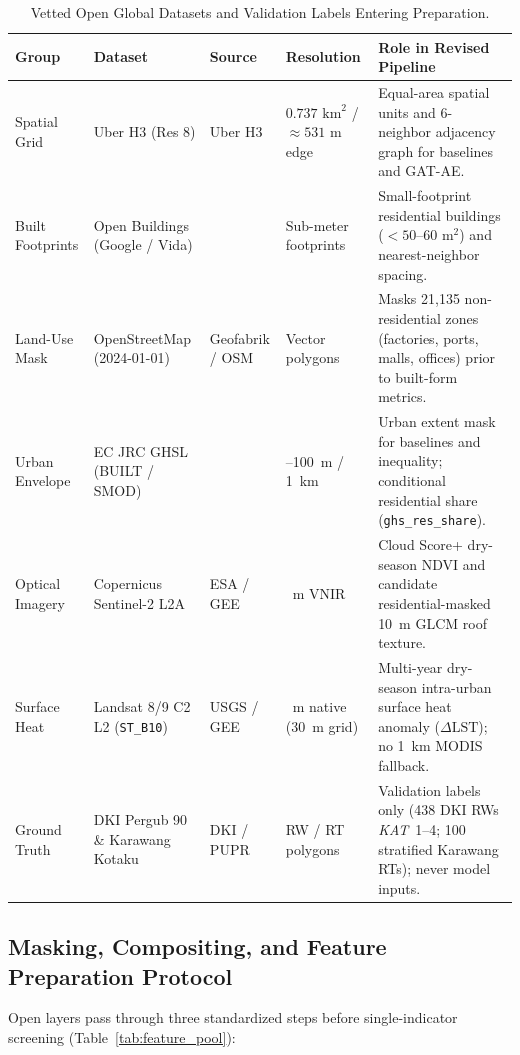 \begin{table}[htbp]
\centering
\caption{Vetted Open Global Datasets and Validation Labels Entering Preparation.}
\label{tab:dataset_inventory}
\footnotesize
\begin{tabularx}{\textwidth}{@{}>{\raggedright\arraybackslash}p{2.2cm}>{\raggedright\arraybackslash}p{3.0cm}>{\raggedright\arraybackslash}p{2.3cm}>{\raggedright\arraybackslash}p{2.0cm}>{\raggedright\arraybackslash}X@{}}
\toprule
\textbf{Group} & \textbf{Dataset} & \textbf{Source} & \textbf{Resolution} & \textbf{Role in Revised Pipeline} \\
\midrule
Spatial Grid & Uber H3 (Res 8) & Uber H3 & $0.737\text{ km}^2$ / $\approx 531\text{ m}$ edge & Equal-area spatial units and 6-neighbor adjacency graph for baselines and GAT-AE. \\
Built Footprints & Open Buildings (Google / Vida) & \citet{Sirko2021} & Sub-meter footprints & Small-footprint residential buildings ($<50$--$60\text{ m}^2$) and nearest-neighbor spacing. \\
Land-Use Mask & OpenStreetMap (2024-01-01) & Geofabrik / OSM & Vector polygons & Masks 21,135 non-residential zones (factories, ports, malls, offices) prior to built-form metrics. \\
Urban Envelope & EC JRC GHSL (BUILT / SMOD) & \citet{Pesaresi2024} & 10--100~m / 1~km & Urban extent mask for baselines and inequality; conditional residential share (\texttt{ghs\_res\_share}). \\
Optical Imagery & Copernicus Sentinel-2 L2A & ESA / GEE & 10~m VNIR & Cloud Score+ dry-season NDVI and candidate residential-masked 10~m GLCM roof texture. \\
Surface Heat & Landsat 8/9 C2 L2 (\texttt{ST\_B10}) & USGS / GEE & 100~m native (30~m grid) & Multi-year dry-season intra-urban surface heat anomaly ($\Delta\text{LST}$); no 1~km MODIS fallback. \\
Ground Truth & DKI Pergub 90 \& Karawang Kotaku & DKI / PUPR & RW / RT polygons & Validation labels only (438 DKI RWs \textit{KAT}~1--4; 100 stratified Karawang RTs); never model inputs. \\
\bottomrule
\end{tabularx}
\end{table}

\subsection{Masking, Compositing, and Feature Preparation Protocol}
Open layers pass through three standardized steps before single-indicator screening (Table~\ref{tab:feature_pool}):

